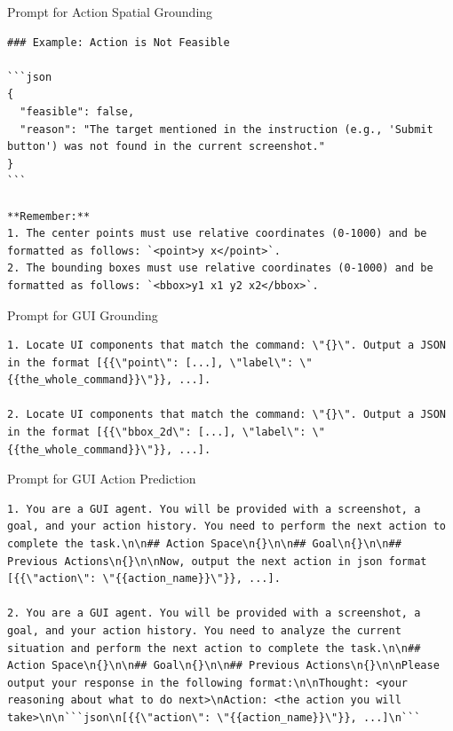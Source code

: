 \documentclass{article}
\theoremstyle{plain}
\theoremstyle{definition}
\theoremstyle{remark}
\begin{document}
\begin{promptbox}{Prompt for Action Spatial Grounding}
\begin{lstlisting}
### Example: Action is Not Feasible

```json
{
  "feasible": false,
  "reason": "The target mentioned in the instruction (e.g., 'Submit button') was not found in the current screenshot."
}
```

**Remember:**
1. The center points must use relative coordinates (0-1000) and be formatted as follows: `<point>y x</point>`.
2. The bounding boxes must use relative coordinates (0-1000) and be formatted as follows: `<bbox>y1 x1 y2 x2</bbox>`.
\end{lstlisting}
\end{promptbox}

\begin{promptbox}{Prompt for GUI Grounding}
\begin{lstlisting}
1. Locate UI components that match the command: \"{}\". Output a JSON in the format [{{\"point\": [...], \"label\": \"{{the_whole_command}}\"}}, ...].

2. Locate UI components that match the command: \"{}\". Output a JSON in the format [{{\"bbox_2d\": [...], \"label\": \"{{the_whole_command}}\"}}, ...].
\end{lstlisting}
\end{promptbox}

\begin{promptbox}{Prompt for GUI Action Prediction}
\begin{lstlisting}
1. You are a GUI agent. You will be provided with a screenshot, a goal, and your action history. You need to perform the next action to complete the task.\n\n## Action Space\n{}\n\n## Goal\n{}\n\n## Previous Actions\n{}\n\nNow, output the next action in json format [{{\"action\": \"{{action_name}}\"}}, ...].

2. You are a GUI agent. You will be provided with a screenshot, a goal, and your action history. You need to analyze the current situation and perform the next action to complete the task.\n\n## Action Space\n{}\n\n## Goal\n{}\n\n## Previous Actions\n{}\n\nPlease output your response in the following format:\n\nThought: <your reasoning about what to do next>\nAction: <the action you will take>\n\n```json\n[{{\"action\": \"{{action_name}}\"}}, ...]\n```
\end{lstlisting}
\end{promptbox}
\end{document}
